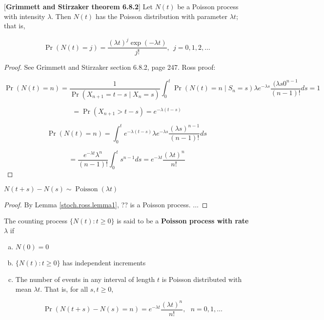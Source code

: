\begin{theorem}\label{stoch.pois.proc.thm.6.8.2}[\textbf{Grimmett and Stirzaker theorem 6.8.2}] Let \(N(t)\) be a Poisson process with intensity \(\lambda\). Then \(N(t)\) has the Poisson distribution with parameter \(\lambda t\); that is,

\[
\Pr(N(t) = j)  = \frac{(\lambda t)^j \exp(-\lambda t)}{j!}, \ \ j = 0, 1, 2, \ldots
\]
\end{theorem}

\begin{proof}See Grimmett and Stirzaker section 6.8.2, page 247. Ross proof:

\[
\Pr(N(t) =n) = \frac{1}{\Pr(X_{n+1} = t-s \mid X_n =s)} \int_0^t \Pr(N(t) = n \mid S_n = s) \lambda e^{-\lambda s} \frac{(\lambda s0^{n-1}}{(n-1)!} ds = 1
\] 

\[
= \Pr(X_{n+1} > t-s) = e^{-\lambda(t-s)}
\]

\[
\Pr(N(t) = n) = \int_0^t e^{-\lambda(t-s)} \lambda e^{-\lambda s} \frac{(\lambda s)^{n-1} }{(n-1)!} ds
\]

\[
= \frac{e^{-\lambda t} \lambda^n}{(n-1)!} \int_0^t s^{n-1} ds = e^{-\lambda t} \frac{(\lambda t)^n}{n!}
\]

\end{proof}

\begin{corollary} \(N(t+s) - N(s) \sim \operatorname{Poisson}(\lambda t)\)

\end{corollary}

\begin{proof}By Lemma \ref{stoch.ross.lemma1}, ?? is a Poisson process. \(\ldots\)

\end{proof}


\begin{definition}\label{stoch.pois.proc.def.ross.2.1.1}The counting process \(\{N(t): t\geq 0\}\) is said to be a  \textbf{Poisson process with rate \(\lambda\)} if

\begin{enumerate}[(a)]

\item \(N(0) = 0\)


\item \(\{N(t) : t \geq 0\}\) has independent increments

\item The number of events in any interval of length \(t\) is Poisson distributed with mean \(\lambda t\). That is, for all \(s, t \geq 0\),

\[
\Pr(N(t+s) - N(s) = n) = e^{-\lambda t} \frac{(\lambda t)^n}{n!}, \ \ \ n = 0, 1, \ldots
\]


\end{enumerate}

\end{definition}

